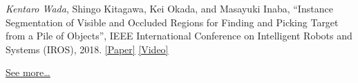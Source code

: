 \documentclass[letterpaper,MMMyyyy,nonstop]{simpleresumecv}
\begin{document}
\begin{body}
\BulletItem
\textit{Kentaro Wada}, Shingo Kitagawa, Kei Okada, and Masayuki Inaba,
``Instance Segmentation of Visible and Occluded Regions for Finding and Picking Target from a Pile of Objects'',
IEEE International Conference on Intelligent Robots and Systems (IROS), 2018.
\href{https://arxiv.org/abs/2001.07475}{\underline{[Paper]}}
\href{https://youtu.be/tNLtXb04i3w}{\underline{[Video]}}

\hfill
\href{https://scholar.google.com/citations?user=JoeSwcoAAAAJ&hl=ja}{\underline{See more…}}











\end{body}
\end{document}
